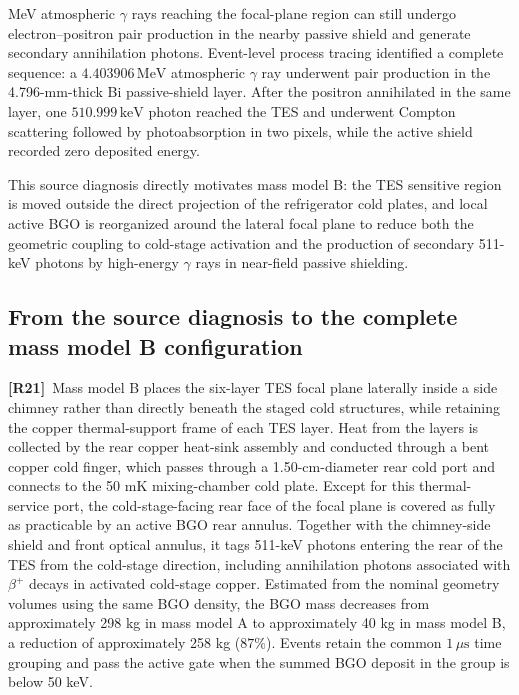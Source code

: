 \documentclass[11pt]{article}
\newcommand{\revmark}[1]{\textcolor{revisionblue}{\textbf{[R#1]}}\ }
\newcommand{\revblue}[1]{\textcolor{revisionblue}{#1}}
\newcommand{\keV}{\ensuremath{\,\mathrm{keV}}}
\newcommand{\MeV}{\ensuremath{\,\mathrm{MeV}}}
\begin{document}
MeV atmospheric $\gamma$ rays reaching the focal-plane region can still undergo electron--positron pair production in the nearby passive shield and generate secondary annihilation photons. Event-level process tracing identified a complete sequence: a $4.403906\MeV$ atmospheric $\gamma$ ray underwent pair production in the 4.796-mm-thick Bi passive-shield layer. After the positron annihilated in the same layer, one $510.999\keV$ photon reached the TES and underwent Compton scattering followed by photoabsorption in two pixels, while the active shield recorded zero deposited energy.

This source diagnosis directly motivates mass model B: the TES sensitive region is moved outside the direct projection of the refrigerator cold plates, and local active BGO is reorganized around the lateral focal plane to reduce both the geometric coupling to cold-stage activation and the production of secondary 511-keV photons by high-energy $\gamma$ rays in near-field passive shielding.
\endgroup

\FloatBarrier

\subsection{From the source diagnosis to the complete mass model B configuration}
\label{subsec:optimized_shield_results}

\revmark{21}\revblue{Mass model B places the six-layer TES focal plane laterally inside a side chimney rather than directly beneath the staged cold structures, while retaining the copper thermal-support frame of each TES layer. Heat from the layers is collected by the rear copper heat-sink assembly and conducted through a bent copper cold finger, which passes through a 1.50-cm-diameter rear cold port and connects to the 50 mK mixing-chamber cold plate. Except for this thermal-service port, the cold-stage-facing rear face of the focal plane is covered as fully as practicable by an active BGO rear annulus. Together with the chimney-side shield and front optical annulus, it tags 511-keV photons entering the rear of the TES from the cold-stage direction, including annihilation photons associated with $\beta^+$ decays in activated cold-stage copper. Estimated from the nominal geometry volumes using the same BGO density, the BGO mass decreases from approximately 298 kg in mass model A to approximately 40 kg in mass model B, a reduction of approximately 258 kg ($87\%$). Events retain the common $1\,\mu\mathrm{s}$ time grouping and pass the active gate when the summed BGO deposit in the group is below 50 keV.}
\end{document}
